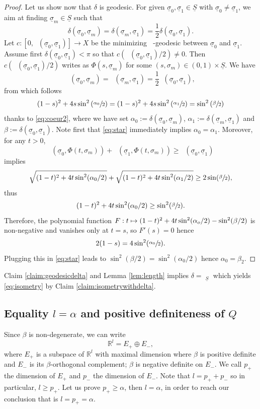 \documentclass[10pt]{amsart}
\newcommand\mto{\mathchoice{\longmapsto}{\mapsto}{\mapsto}{\mapsto}}
\theoremstyle{plain}
\theoremstyle{definition}
\newcommand{\setR}{\mathbb{R}}
\newcommand{\dist}{\mathsf{d}}
\newcommand{\usigma}{\underline{\sigma}}
\DeclareMathOperator{\udist}{\underline{\dist}}
\newcommand{\uS}{\underline{S}}
\begin{document}
\begin{proof}
Let us show now that $\delta$ is geodesic. For given $\usigma_0, \usigma_1 \in \uS$ with $\usigma_0 \neq \usigma_1$, we aim at finding $\usigma_m \in \uS$ such that
\[
\delta(\usigma_0,\usigma_m)=\delta(\usigma_m,\usigma_1)=\frac12\delta(\usigma_0,\usigma_1).
\]
Let $c:[0,\udist(\usigma_0,\usigma_1)]\to X$ be the minimizing $\udist$-geodesic between $\usigma_0$ and $\usigma_1$. Assume first $\delta(\usigma_0,\usigma_1)<\pi$ so that $c(\udist(\usigma_0,\usigma_1)/2)\neq 0$. Then $c(\udist(\usigma_0,\usigma_1)/2)$ writes as $\Phi(s,\usigma_m)$ for some $(s,\sigma_m) \in (0,1) \times \uS$. We have
\[
\udist(\usigma_0,\usigma_m) = \udist(\usigma_m,\usigma_1) = \frac{1}{2}\udist(\usigma_0,\usigma_1),
\]
from which follows
\begin{equation}\label{eq:star}
(1-s)^2 + 4 s \sin^2\left(\sfrac{\alpha_0}{2}\right)=(1-s)^2 + 4 s \sin^2\left(\sfrac{\alpha_1}{2}\right)= \sin^2\left(\sfrac{\beta}{2}\right)
\end{equation}
thanks to \eqref{eq:coeur2}, where we have set $\alpha_0:=\delta(\usigma_0,\usigma_m)$, $\alpha_1:=\delta(\usigma_m,\usigma_1)$ and $\beta:=\delta(\usigma_0,\usigma_1)$.
Note first that \eqref{eq:star} immediately implies $\alpha_0=\alpha_1$. Moreover, for any $t>0$,
\[
\udist\left(\usigma_0,\Phi(t,\sigma_m)\right)+\udist\left(\usigma_1,\Phi(t,\sigma_m)\right)\ge \udist\left(\usigma_0,\usigma_1\right)
\]
implies
\[
\sqrt{(1-t)^2 + 4t \sin^2(\alpha_0/2)} + \sqrt{(1-t)^2 + 4t \sin^2(\alpha_1/2)} \ge 2 \sin(\sfrac{\beta}{2}),
\]
thus
\[
(1-t)^2 + 4t \sin^2(\alpha_0/2) \ge \sin^2(\sfrac{\beta}{2}).
\]
Therefore, the polynomial function $F: t \mto (1-t)^2 + 4t\sin^2(\alpha_o/2) - \sin^2(\beta/2)$
is non-negative and vanishes only at $t=s$, so $F'(s)=0$ hence
\[
2(1-s) = 4 \sin^2(\sfrac{\alpha_0}{2}).
\]
Plugging this in \eqref{eq:star} leads to $\sin^2(\beta/2) = \sin^2(\alpha_0/2)$
hence $\alpha_0=\beta_2$.
\end{proof}

Claim \ref{claim:geodesicdelta} and Lemma \ref{lem:length} implies $\delta=\udist_{\uS}$ which yields \eqref{eq:isometry} by Claim \ref{claim:isometrywithdelta}.

\subsection{Equality $l=\alpha$ and positive definiteness of $Q$}\label{subsec:4.3}

Since $\beta$ is non-degenerate, we can write
\begin{equation}\label{eq:decomposition}
\setR^l = E_+\oplus E_-,
\end{equation}
where $E_+$ is a subspace of $\setR^l$ with maximal dimension where $\beta$ is positive definite and $E_-$ is its $\beta$-orthogonal complement; $\beta$ is negative definite on $E_-$. We call $p_+$ the dimension of $E_+$ and $p_-$ the dimension of $E_-$. Note that $l = p_+ + p_-$ so in particular, $l \ge p_+$. Let us prove $p_+ \ge \alpha$, then $l = \alpha$, in order to reach our conclusion that is $l=p_+=\alpha$.
\end{document}
